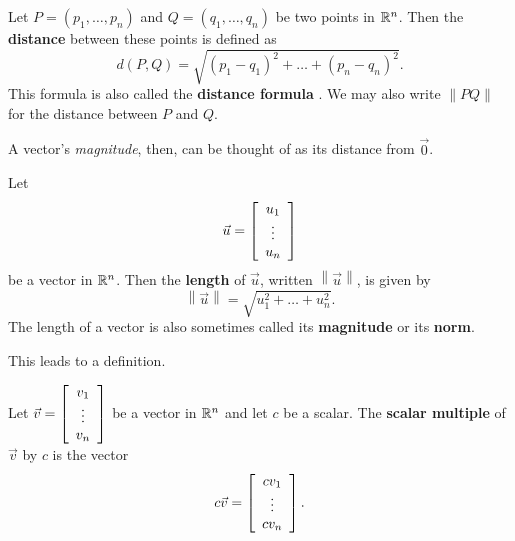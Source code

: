 \documentclass{ximera}
\begin{document}
  
\begin{definition}
  
  Let $P=(p_1,\ldots,p_n)$ and $Q=(q_1,\ldots,q_n)$ be two points in
  $\R^n$. Then the \textbf{distance}%
   between these points is defined as
  \begin{equation*}
    d(P, Q) = \sqrt{(p_1-q_1)^2 + \ldots + (p_n-q_n)^2}.
  \end{equation*}
  This formula is also called the \textbf{distance formula}%
  . We may also write $\left\|PQ\right\|$ for the
  distance between $P$ and $Q$.
\end{definition}

A vector's \textit{magnitude}, then, can be thought of as its distance from $\vec{0}$. 

\begin{definition}
  Let
  \begin{equation*}
    \vec{u} = \startmat{c} u_1 \\ \vdots \\ u_n \stopmat
  \end{equation*}
  be a vector in $\R^n$. Then the \textbf{length}%
   of $\vec{u}$, written $\left\| \vec{u} \right\|$,
  is given by
  \begin{equation*}
    \left\| \vec{u} \right\| = \sqrt{u_1^2 + \ldots + u_n^2}.
  \end{equation*}
  The length of a vector is also sometimes called its
  \textbf{magnitude} or its
  \textbf{norm}.
\end{definition}

This leads to a definition.

\begin{definition}

  Let $\vec{v} = \startmat{c} v_1 \\ \vdots \\ v_n \stopmat$ be a vector in $\R^n$ and let $c$ be a scalar. The \textbf{scalar multiple} of $\vec{v}$ by $c$ is the vector
  \begin{equation*}
    c\vec{v} = \startmat{c} cv_1 \\ \vdots \\ cv_n \stopmat.
  \end{equation*}

\end{definition}
\end{document}
